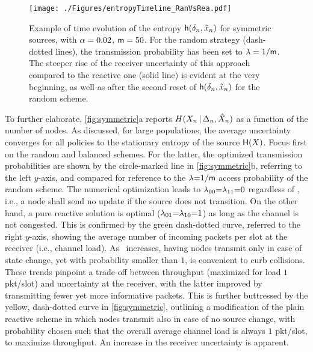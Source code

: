 \begin{figure}
    \centering
    \texttt{[image: ./Figures/entropyTimeline\_RanVsRea.pdf]}
    \caption{Example of time evolution of the entropy $\mathsf h(\delta_n,\hat{x}_n)$ for symmetric sources, with $\alpha=0.02$, $\mathsf m=50$. For the random strategy (dash-dotted lines), the transmission probability has been set to $\lambda=1/\mathsf m$. The steeper rise of the receiver uncertainty of this approach compared to the reactive one (solid line) is evident at the very beginning, as well as after the second reset of $\mathsf h(\delta_n,\hat{x}_n)$ for the random scheme.}
    \vspace{-1em}
    \label{fig:timeline_comparison}
\end{figure}



To further elaborate, \figr\ref*{fig:symmetric}a reports $H(X_n\, | \,\Delta_n,\hat{X}_n)$ as a function of the number of nodes. As discussed, for large populations, the average uncertainty converges for all policies to the stationary entropy of the source $\mathsf H(X)$. Focus first on the random and balanced schemes. For the latter, the optimized transmission probabilities are shown by the circle-marked line in \figr\ref*{fig:symmetric}b, referring to the left $y$-axis, and compared for reference to the $\lambda{=}1/\mathsf m$ access probability of the random scheme. The numerical optimization leads to $\lambda_{00}{=}\lambda_{11}{=}0$ regardless of \nodes, i.e., a node shall send no update if the source does not transition. On the other hand, a pure reactive solution is optimal ($\lambda_{01}{=}\lambda_{10}{=}1$) as long as the channel is not congested. This is confirmed by the green dash-dotted curve, referred to the right $y$-axis, showing the  average number of incoming packets per slot at the receiver (i.e., channel load). As \nodes\ increases, having nodes transmit only in case of state change, yet with probability smaller than $1$, is convenient to curb collisions. These  trends pinpoint a trade-off between throughput (maximized for load $1$ pkt/slot) and uncertainty at the receiver, with the latter improved by transmitting fewer yet more informative packets. This is further buttressed by the yellow, dash-dotted curve in \figr\ref*{fig:symmetric}, outlining a modification of the plain reactive scheme in which nodes transmit also in case of no source change, with probability chosen such that the overall average channel load is always $1$ pkt/slot, to maximize throughput. An increase in the receiver uncertainty is apparent.

